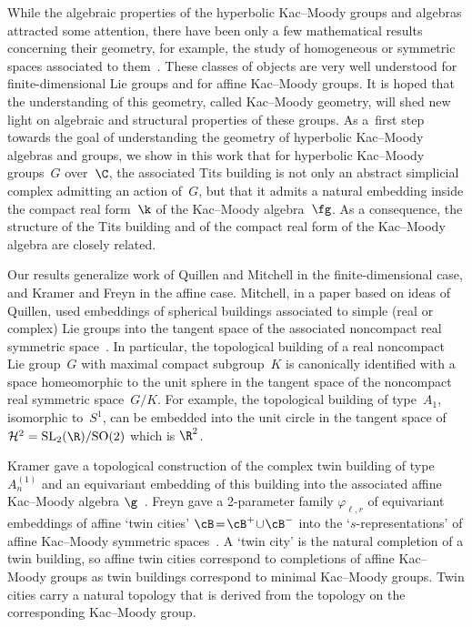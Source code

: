  While the algebraic properties of the hyperbolic Kac--Moody groups and algebras attracted some attention, there have been only a few mathematical results concerning their geometry, for example, the study of homogeneous or symmetric spaces associated to them~\cite{FreynHartnickHornKoehl17}.
These classes of objects are very well understood for finite-dimensional Lie groups and for affine Kac--Moody groups. It is hoped that the understanding of this geometry, called Kac--Moody geometry, will shed new light on algebraic and structural properties of these groups. As a~first step towards the goal of understanding the geometry of hyperbolic Kac--Moody algebras and groups, we show in this work that for
hyperbolic Kac--Moody groups~$G$ over~$\C$, the associated Tits building is not only an abstract simplicial complex admitting an action of~$G$, but that it admits a natural embedding inside the compact real form~$\k$ of the Kac--Moody algebra~$\fg$. As a consequence, the structure of the Tits building and of the compact real form of the Kac--Moody algebra are closely related.

Our results generalize work of Quillen and Mitchell in the finite-dimensional case, and Kramer and Freyn in the affine case. Mitchell, in a paper based on ideas of Quillen, used embeddings of spherical buildings associated to simple (real or complex) Lie groups into the tangent space of
the associated noncompact real symmetric space~\cite{Mitchell88}. In particular, the topological building of a real noncompact Lie group~$G$ with maximal compact subgroup~$K$ is canonically identified with a space homeomorphic to the unit sphere in the tangent space of the noncompact real symmetric space~$G/K$. For example, the topological building of type~$A_1$, isomorphic to~$S^1$, can be embedded into the unit circle in the tangent space of $\mathcal{H}^2={\rm SL}_2(\R)/{\rm SO}(2)$ which is $\R^2$.

Kramer gave a topological construction of the complex twin building of type $A_n^{(1)}$ and an equivariant embedding of this building into the associated affine Kac--Moody algebra $\g$~\cite{Kramer02}.
Freyn gave a 2-parameter family $\varphi_{\ell,r}$ of equivariant embeddings of affine `twin cities' \mbox{$\cB \!=\! \cB^+\!\cup\! \cB^-$} into the `$s$-representations' of affine Kac--Moody symmetric spaces~\cite{Freyn09, Freyn10b, Freyn10d, Freyn14, Freyn15b}. A `twin city' is the natural completion of a twin building, so affine twin cities correspond to completions of affine Kac--Moody groups as twin buildings correspond to minimal Kac--Moody groups. Twin cities carry a natural topology that is derived from the topology on the corresponding Kac--Moody group.

